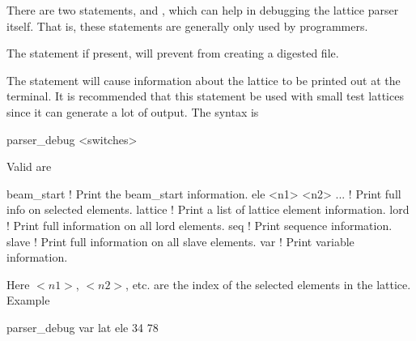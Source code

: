 There are two statements,  and ,
which can help in debugging the \bmad lattice parser
itself.  That is, these statements are generally only used by programmers.

The  statement if present, will prevent \bmad from 
creating a digested file. 

The  statement will cause information about the
lattice to be printed out at the terminal. It is recommended that this
statement be used with small test lattices since it can generate a lot
of output. The syntax is
\begin{example}
  parser_debug <switches>
\end{example}
Valid  are
\begin{example}
  beam_start          ! Print the beam_start information.
  ele <n1> <n2> ...   ! Print full info on selected elements.
  lattice             ! Print a list of lattice element information.
  lord                ! Print full information on all lord elements.
  seq                 ! Print sequence information.
  slave               ! Print full information on all slave elements.
  var                 ! Print variable information.
\end{example}
Here $<n1>$, $<n2>$, etc. are the index of the selected elements in
the lattice.  Example
\begin{example}
  parser_debug var lat ele 34 78
\end{example}




